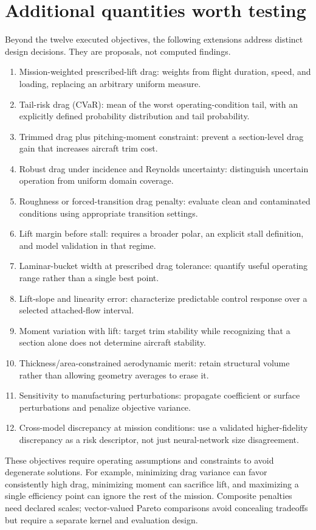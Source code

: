 \documentclass[11pt,a4paper]{article}
\begin{document}
\section{Additional quantities worth testing}
Beyond the twelve executed objectives, the following extensions address distinct design decisions. They are proposals, not computed findings.
\begin{enumerate}
\item Mission-weighted prescribed-lift drag: weights from flight duration, speed, and loading, replacing an arbitrary uniform measure.
\item Tail-risk drag (CVaR): mean of the worst operating-condition tail, with an explicitly defined probability distribution and tail probability.
\item Trimmed drag plus pitching-moment constraint: prevent a section-level drag gain that increases aircraft trim cost.
\item Robust drag under incidence and Reynolds uncertainty: distinguish uncertain operation from uniform domain coverage.
\item Roughness or forced-transition drag penalty: evaluate clean and contaminated conditions using appropriate transition settings.
\item Lift margin before stall: requires a broader polar, an explicit stall definition, and model validation in that regime.
\item Laminar-bucket width at prescribed drag tolerance: quantify useful operating range rather than a single best point.
\item Lift-slope and linearity error: characterize predictable control response over a selected attached-flow interval.
\item Moment variation with lift: target trim stability while recognizing that a section alone does not determine aircraft stability.
\item Thickness/area-constrained aerodynamic merit: retain structural volume rather than allowing geometry averages to erase it.
\item Sensitivity to manufacturing perturbations: propagate coefficient or surface perturbations and penalize objective variance.
\item Cross-model discrepancy at mission conditions: use a validated higher-fidelity discrepancy as a risk descriptor, not just neural-network size disagreement.
\end{enumerate}
These objectives require operating assumptions and constraints to avoid degenerate solutions. For example, minimizing drag variance can favor consistently high drag, minimizing moment can sacrifice lift, and maximizing a single efficiency point can ignore the rest of the mission. Composite penalties need declared scales; vector-valued Pareto comparisons avoid concealing tradeoffs but require a separate kernel and evaluation design.
\end{document}
